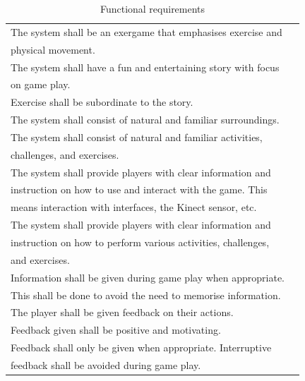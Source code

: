 \begin{table} [H]
\label{tab:func1}
\centering
    \begin{tabular}{|l|l|}
       \hline
       The system shall be an exergame that emphasises exercise and \\ physical movement.  \\ \hline
       The system shall have a fun and entertaining story with focus \\ on game play.  \\ \hline
       Exercise shall be subordinate to the story. \\ \hline
	   The system shall consist of natural and familiar surroundings. \\ \hline
	   The system shall consist of natural and familiar activities, \\ challenges, and exercises.\\ \hline
	   The system shall provide players with clear information and \\ instruction on how to use and interact with the game. This \\ means interaction with interfaces, the Kinect sensor, etc. \\ \hline
	   The system shall provide players with clear information and \\ instruction on how to perform various activities, challenges,\\ and exercises. \\ \hline
	   Information shall be given during game play when appropriate. \\ This shall be done to avoid the need to memorise information. \\ \hline
	   The player shall be given feedback on their actions.\\ \hline
	   Feedback given shall be positive and motivating.\\ \hline
	   Feedback shall only be given when appropriate. Interruptive \\ feedback shall be avoided during game play. \\ \hline
    \end{tabular}
    \caption[Functional requirements]{Functional requirements}
\end{table} 

